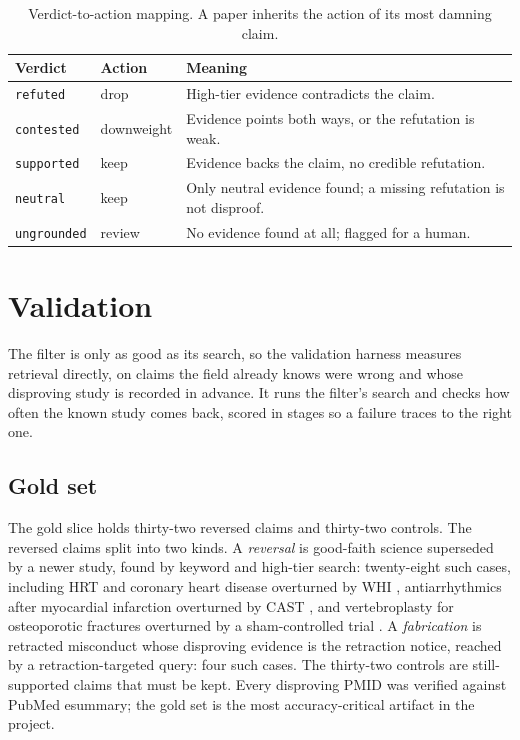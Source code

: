 \documentclass[11pt,a4paper]{article}
\begin{document}
\begin{table}[h]
\centering
\begin{tabular}{lll}
\toprule
\textbf{Verdict} & \textbf{Action} & \textbf{Meaning} \\
\midrule
\texttt{refuted} & drop & High-tier evidence contradicts the claim. \\
\texttt{contested} & downweight & Evidence points both ways, or the refutation is weak. \\
\texttt{supported} & keep & Evidence backs the claim, no credible refutation. \\
\texttt{neutral} & keep & Only neutral evidence found; a missing refutation is not disproof. \\
\texttt{ungrounded} & review & No evidence found at all; flagged for a human. \\
\bottomrule
\end{tabular}
\caption{Verdict-to-action mapping. A paper inherits the action of its most damning claim.}
\label{tab:actions}
\end{table}

\section{Validation}

The filter is only as good as its search, so the validation harness measures retrieval directly, on claims the field already knows were wrong and whose disproving study is recorded in advance. It runs the filter's search and checks how often the known study comes back, scored in stages so a failure traces to the right one.

\subsection{Gold set}

The gold slice holds thirty-two reversed claims and thirty-two controls. The reversed claims split into two kinds. A \emph{reversal} is good-faith science superseded by a newer study, found by keyword and high-tier search: twenty-eight such cases, including HRT and coronary heart disease overturned by WHI \citep{whi2002}, antiarrhythmics after myocardial infarction overturned by CAST \citep{cast1989}, and vertebroplasty for osteoporotic fractures overturned by a sham-controlled trial \citep{buchbinder2009}. A \emph{fabrication} is retracted misconduct whose disproving evidence is the retraction notice, reached by a retraction-targeted query: four such cases. The thirty-two controls are still-supported claims that must be kept. Every disproving PMID was verified against PubMed esummary; the gold set is the most accuracy-critical artifact in the project.
\end{document}
